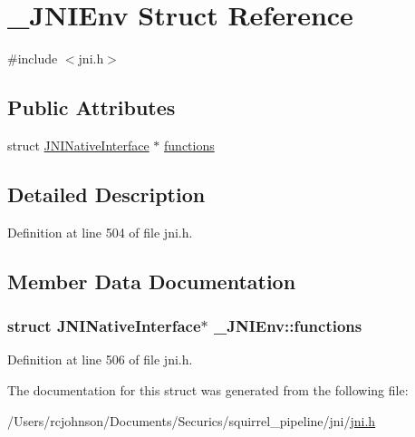 \hypertarget{struct___j_n_i_env}{\section{\-\_\-\-J\-N\-I\-Env Struct Reference}
\label{struct___j_n_i_env}
}


{\ttfamily \#include $<$jni.\-h$>$}

\subsection*{Public Attributes}
\begin{DoxyCompactItemize}
\item 
struct \hyperlink{struct_j_n_i_native_interface}{J\-N\-I\-Native\-Interface} $\ast$ \hyperlink{struct___j_n_i_env_acef9b977efc20a861da781946c1a67f2}{functions}
\end{DoxyCompactItemize}


\subsection{Detailed Description}


Definition at line 504 of file jni.\-h.



\subsection{Member Data Documentation}
\hypertarget{struct___j_n_i_env_acef9b977efc20a861da781946c1a67f2}{
\subsubsection[{functions}]{\setlength{\rightskip}{0pt plus 5cm}struct {\bf J\-N\-I\-Native\-Interface}$\ast$ \-\_\-\-J\-N\-I\-Env\-::functions}}\label{struct___j_n_i_env_acef9b977efc20a861da781946c1a67f2}


Definition at line 506 of file jni.\-h.



The documentation for this struct was generated from the following file\-:\begin{DoxyCompactItemize}
\item 
/\-Users/rcjohnson/\-Documents/\-Securics/squirrel\-\_\-pipeline/jni/\hyperlink{jni_8h}{jni.\-h}\end{DoxyCompactItemize}

